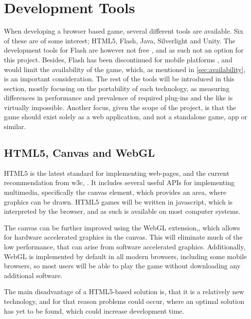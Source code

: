 \section{Development Tools}

\label{sec:tools}

When developing a browser based game, several different tools are available. Six of these are of some interest; HTML5, Flash, Java, Silverlight and Unity.
The development tools for Flash are however not free \cite{adobe13}, and as such not an option for this project.
Besides, Flash has been discontinued for mobile platforms \cite{adobe12}, and would limit the availability of the game, which, as mentioned in \autoref{sec:availability}, is an important consideration.
The rest of the tools will be introduced in this section, mostly focusing on the portability of each technology, as measuring differences in performance and prevalence of required plug-ins and the like is virtually impossible.
Another focus, given the scope of the project, is that the game should exist solely as a web application, and not a standalone game, app or similar.

\subsection{HTML5, Canvas and WebGL}
HTML5 is the latest standard for implementing web-pages, and the current recommendation from \ac{w3c}, \cite{html513}.
It includes several useful APIs for implementing multimedia, specifically the canvas element, which provides an area, where graphics can be drawn.
HTML5 games will be written in javascript, which is interpreted by the browser, and as such is available on most computer systems.\newline

The canvas can be further improved using the WebGL extension,\cite{khronos13}, which allows for hardware accelerated graphics in the canvas. 
This will eliminate much of the low performance, that can arise from software accelerated graphics.
Additionally, WebGL is implemented by default in all modern browsers, including some mobile browsers, so most users will be able to play the game without downloading any additional software.

The main disadvantage of a HTML5-based solution is, that it is a relatively new technology, and for that reason problems could occur, where an optimal solution has yet to be found, which could increase development time.

